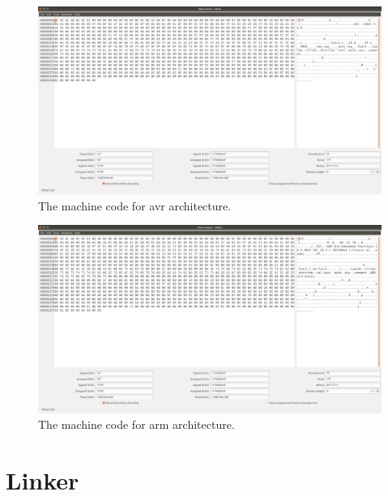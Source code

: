\documentclass[]{beamer}
\begin{document}
\begin{frame}
  

  \begin{figure}[!htb]
    \centering
    \includegraphics[width=\linewidth]{figures/avr.png}
    \caption{The machine code for avr architecture.}
    \label{fig:question}
  \end{figure}

\end{frame}

\begin{frame}
  

  \begin{figure}[!htb]
    \centering
    \includegraphics[width=\linewidth]{figures/arm.png}
    \caption{The machine code for arm architecture.}
    \label{fig:question}
  \end{figure}

\end{frame}



\section{Linker}
\end{document}
